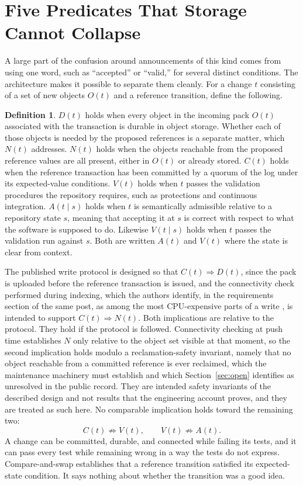 \documentclass[11pt]{article}
\theoremstyle{definition}
\newtheorem{definition}{Definition}
\theoremstyle{plain}
\begin{document}
\section{Five Predicates That Storage Cannot Collapse}\label{sec:predicates}

A large part of the confusion around announcements of this kind comes from using one word, such as ``accepted'' or ``valid,'' for several distinct conditions. The architecture makes it possible to separate them cleanly. For a change $t$ consisting of a set of new objects $O(t)$ and a reference transition, define the following.

\begin{definition}
$D(t)$ holds when every object in the incoming pack $O(t)$ associated with the transaction is durable in object storage. Whether each of those objects is needed by the proposed references is a separate matter, which $N(t)$ addresses. $N(t)$ holds when the objects reachable from the proposed reference values are all present, either in $O(t)$ or already stored. $C(t)$ holds when the reference transaction has been committed by a quorum of the log under its expected-value conditions. $V(t)$ holds when $t$ passes the validation procedures the repository requires, such as protections and continuous integration. $A(t\mid s)$ holds when $t$ is semantically admissible relative to a repository state $s$, meaning that accepting it at $s$ is correct with respect to what the software is supposed to do. Likewise $V(t\mid s)$ holds when $t$ passes the validation run against $s$. Both are written $A(t)$ and $V(t)$ where the state is clear from context.
\end{definition}

The published write protocol is designed so that $C(t)\Rightarrow D(t)$, since the pack is uploaded before the reference transaction is issued, and the connectivity check performed during indexing, which the authors identify, in the requirements section of the same post, as among the most CPU-expensive parts of a write \cite{raman2026}, is intended to support $C(t)\Rightarrow N(t)$. Both implications are relative to the protocol. They hold if the protocol is followed. Connectivity checking at push time establishes $N$ only relative to the object set visible at that moment, so the second implication holds modulo a reclamation-safety invariant, namely that no object reachable from a committed reference is ever reclaimed, which the maintenance machinery must establish and which Section~\ref{sec:open} identifies as unresolved in the public record. They are intended safety invariants of the described design and not results that the engineering account proves, and they are treated as such here. No comparable implication holds toward the remaining two:
\[
C(t)\not\Rightarrow V(t),\qquad V(t)\not\Rightarrow A(t).
\]
A change can be committed, durable, and connected while failing its tests, and it can pass every test while remaining wrong in a way the tests do not express. Compare-and-swap establishes that a reference transition satisfied its expected-state condition. It says nothing about whether the transition was a good idea.
\end{document}
